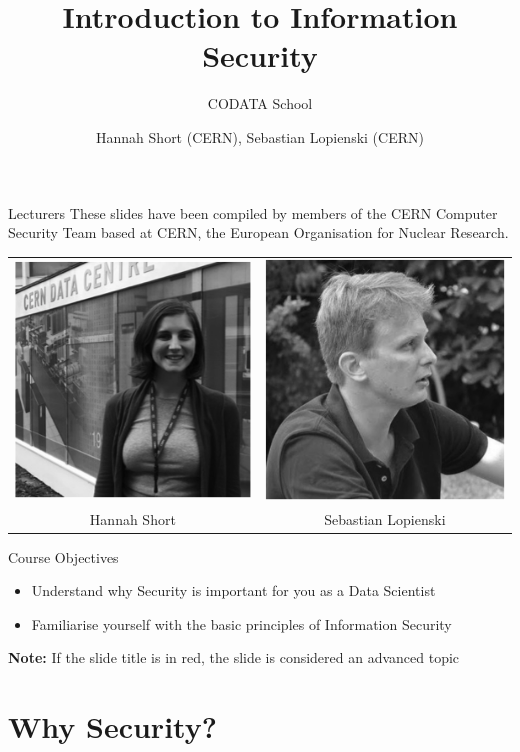 \documentclass{beamer}
\author{Hannah Short (CERN), Sebastian Lopienski (CERN)}
\title{Introduction to Information Security}
\subtitle{CODATA School}
\begin{document}
\frontcover

\frame{\titlepage}

\begin{frame}{Lecturers}
These slides have been compiled by members of the CERN Computer Security Team based at CERN, the European Organisation for Nuclear Research.
\begin{center}
\begin{tabular}{ c c  }
 \includegraphics[width=0.2\linewidth]{lecturer1.png} & \includegraphics[width=0.2\linewidth]{Lecturer2.png}  \\ 
 Hannah Short & Sebastian Lopienski  \\  
\end{tabular}
\end{center}
\end{frame}

\frame{\tableofcontents}

\begin{frame}{Course Objectives}
	\begin{itemize}
		\item Understand why Security is important for you as a Data Scientist
		\item Familiarise yourself with the basic principles of Information Security
	\end{itemize}
\textbf{Note:} \newline
\textit{}{If the slide title is in {\color{red}red}, the slide is considered an advanced topic}
\end{frame}

\section{Why Security?}
\frame{\sectionpage}
\end{document}
